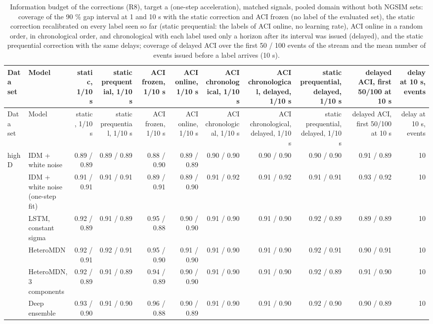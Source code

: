 \begin{longtable}{llrrrrrrrrr}
\caption{Information budget of the corrections (R8), target a (one-step acceleration), matched signals, pooled domain without both NGSIM sets: coverage of the 90 \% gap interval at 1 and 10 s with the static correction and ACI frozen (no label of the evaluated set), the static correction recalibrated on every label seen so far (static prequential: the labels of ACI online, no learning rate), ACI online in a random order, in chronological order, and chronological with each label used only a horizon after its interval was issued (delayed), and the static prequential correction with the same delays; coverage of delayed ACI over the first 50 / 100 events of the stream and the mean number of events issued before a label arrives (10 s).}\label{tab:t4-info-budget--lodo-ngsim-all--a} \\
\toprule
Data set & Model & static, 1/10 s & static prequential, 1/10 s & ACI frozen, 1/10 s & ACI online, 1/10 s & ACI chronological, 1/10 s & ACI chronological, delayed, 1/10 s & static prequential, delayed, 1/10 s & delayed ACI, first 50/100 at 10 s & delay at 10 s, events \\
\midrule
\endfirsthead
\toprule
Data set & Model & static, 1/10 s & static prequential, 1/10 s & ACI frozen, 1/10 s & ACI online, 1/10 s & ACI chronological, 1/10 s & ACI chronological, delayed, 1/10 s & static prequential, delayed, 1/10 s & delayed ACI, first 50/100 at 10 s & delay at 10 s, events \\
\midrule
\endhead
\bottomrule
\endlastfoot
highD & IDM + white noise & 0.89 / 0.89 & 0.89 / 0.89 & 0.88 / 0.90 & 0.89 / 0.89 & 0.90 / 0.90 & 0.90 / 0.90 & 0.90 / 0.90 & 0.91 / 0.89 & 10 \\
 & IDM + white noise (one-step fit) & 0.91 / 0.91 & 0.91 / 0.91 & 0.89 / 0.91 & 0.89 / 0.90 & 0.91 / 0.92 & 0.91 / 0.92 & 0.91 / 0.91 & 0.93 / 0.92 & 10 \\
 & LSTM, constant sigma & 0.92 / 0.89 & 0.91 / 0.89 & 0.95 / 0.88 & 0.90 / 0.90 & 0.91 / 0.90 & 0.91 / 0.90 & 0.92 / 0.89 & 0.89 / 0.89 & 10 \\
 & HeteroMDN & 0.92 / 0.91 & 0.92 / 0.91 & 0.95 / 0.90 & 0.91 / 0.90 & 0.91 / 0.90 & 0.91 / 0.90 & 0.92 / 0.91 & 0.90 / 0.91 & 10 \\
 & HeteroMDN, 3 components & 0.92 / 0.89 & 0.91 / 0.89 & 0.94 / 0.89 & 0.90 / 0.90 & 0.91 / 0.90 & 0.91 / 0.90 & 0.92 / 0.89 & 0.91 / 0.90 & 10 \\
 & Deep ensemble & 0.93 / 0.90 & 0.91 / 0.90 & 0.96 / 0.88 & 0.90 / 0.89 & 0.91 / 0.90 & 0.91 / 0.90 & 0.92 / 0.90 & 0.90 / 0.89 & 10 \\

\end{longtable}
